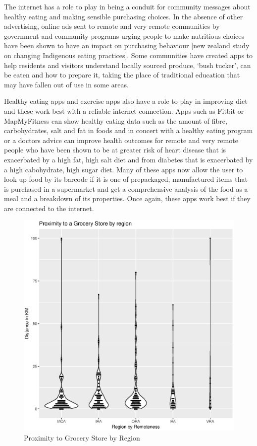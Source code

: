 The internet has a role to play in being a conduit for community messages about healthy eating and making sensible purchasing choices. In the absence of other advertising, online ads sent to remote and very remote communities by government and community programs urging people to make nutritious choices have been shown to have an impact on purchasing behaviour [new zealand study on changing Indigenous eating practices]. Some communities have created apps to help residents and visitors understand locally sourced produce, `bush tucker',  can be eaten and how to prepare it, taking the place of traditional education that may have fallen out of use in some areas.

Healthy eating apps and exercise apps also have a role to play in improving diet and these work best with a reliable internet connection. Apps such as Fitbit or MapMyFitness can show healthy eating data such as the amount of fibre, carbohydrates, salt and fat in foods and in concert with a healthy eating program or a doctors advice can improve health outcomes for remote and very remote people who have been shown to be at greater risk of heart disease that is exacerbated by a high fat, high salt diet and from diabetes that is exacerbated by a high cabohydrate, high sugar diet. Many of these apps now allow the user to look up food by its barcode if it is one of prepackaged, manufactured items that is purchased in a supermarket and get a comprehensive analysis of the food as a meal and a breakdown of its properties. Once again, these apps work best if they are connected to the internet.
\begin{figure}
\centering
\includegraphics[scale=0.5]{figures/VChart09-Proximity2GroceryStore.eps}
\caption{Proximity to Grocery Store by Region} \label{fig:VC09GroceryStoreprox}
\end{figure}

